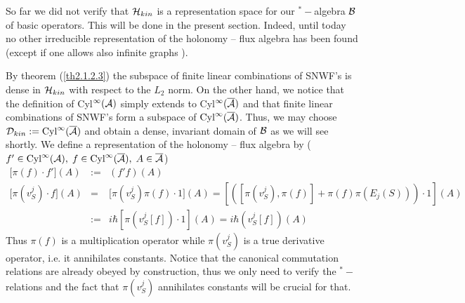 \documentclass[12pt]{report}
\def\ba{\begin{eqnarray}}
\def\ea{\end{eqnarray}}
\def\a{{\cal A}}
\def\ab{\overline{\a}}
\begin{document}
So far we did not verify that ${\cal H}_{kin}$ is a representation space 
for our 
$^\ast-$algebra $\cal B$ of basic operators. This will be done in the 
present section. Indeed, until today no other irreducible 
representation of the holonomy -- flux algebra has been found (except 
if one allows also infinite graphs \cite{36}).

By theorem (\ref{th2.1.2.3}) the subspace of finite
linear combinations of SNWF's is dense in ${\cal H}_{kin}$ with respect to 
the $L_2$ norm. On the other hand, we notice that the definition of 
Cyl$^\infty(\a)$ simply extends to Cyl$^\infty(\ab)$ and that finite linear
combinations of SNWF's form a subspace of 
$\mbox{Cyl}^\infty(\ab)$. Thus, we may choose 
${\cal D}_{kin}:=\mbox{Cyl}^\infty(\ab)$ and obtain a dense, invariant 
domain of $\cal B$ as we will see shortly. We define 
a representation of the holonomy -- flux algebra by 
($f'\in \mbox{Cyl}^\infty(\a),\; f\in \mbox{Cyl}^\infty(\ab),\;A\in \ab$) 
\ba \label{2.1.2.17}
{[}\pi(f)\cdot f'](A) &:=& (f'f)(A) \nonumber\\
{[}\pi(v_S^j)\cdot f](A) &=& 
{[}\pi(v_S^j)\pi(f)\cdot 1](A)
=[([\pi(v_S^j),\pi(f)]+\pi(f)\pi(E_j(S)))\cdot 1](A)
\nonumber\\
&:=& i\hbar[\pi(v_S^j[f]) \cdot 1](A)
=i\hbar (v_S^j[f])(A)
\ea
Thus $\pi(f)$ is a multiplication operator while $\pi(v_S^j)$ is a true 
derivative operator, i.e. it annihilates constants.
Notice that the canonical commutation relations are already obeyed by 
construction, thus we only need to verify the $^\ast-$relations and the 
fact that $\pi(v_S^j)$ annihilates constants will be crucial for that.
\end{document}
